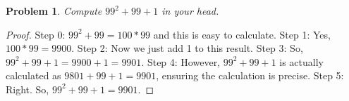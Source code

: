 \documentclass{article}
\newtheorem{theorem}{Problem}
\begin{document}
\begin{theorem}
Compute $99^2+99+1$ in your head.
\end{theorem}

\begin{proof}
Step 0: $99^2+99=100*99$ and this is easy to calculate.
Step 1: Yes, $100*99=9900$.
Step 2: Now we just add 1 to this result.
Step 3: So, $99^2+99+1=9900+1=9901$.
Step 4: However, $99^2 + 99 + 1$ is actually calculated as $9801 + 99 + 1 = 9901$, ensuring the calculation is precise.
Step 5: Right. So, $99^2+99+1=9901$.
\end{proof}
\end{document}
